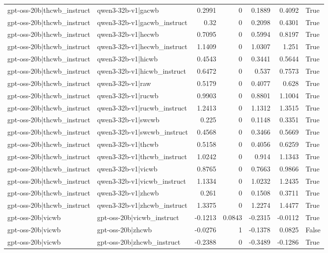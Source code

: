 \begin{table}
\begin{tabular}{l l r r r r l}
gpt-oss-20b|thcwb_instruct & qwen3-32b-v1|gacwb & 0.2991 & 0 & 0.1889 & 0.4092 & True \\
gpt-oss-20b|thcwb_instruct & qwen3-32b-v1|gacwb_instruct & 0.32 & 0 & 0.2098 & 0.4301 & True \\
gpt-oss-20b|thcwb_instruct & qwen3-32b-v1|hecwb & 0.7095 & 0 & 0.5994 & 0.8197 & True \\
gpt-oss-20b|thcwb_instruct & qwen3-32b-v1|hecwb_instruct & 1.1409 & 0 & 1.0307 & 1.251 & True \\
gpt-oss-20b|thcwb_instruct & qwen3-32b-v1|hicwb & 0.4543 & 0 & 0.3441 & 0.5644 & True \\
gpt-oss-20b|thcwb_instruct & qwen3-32b-v1|hicwb_instruct & 0.6472 & 0 & 0.537 & 0.7573 & True \\
gpt-oss-20b|thcwb_instruct & qwen3-32b-v1|raw & 0.5179 & 0 & 0.4077 & 0.628 & True \\
gpt-oss-20b|thcwb_instruct & qwen3-32b-v1|rucwb & 0.9903 & 0 & 0.8801 & 1.1004 & True \\
gpt-oss-20b|thcwb_instruct & qwen3-32b-v1|rucwb_instruct & 1.2413 & 0 & 1.1312 & 1.3515 & True \\
gpt-oss-20b|thcwb_instruct & qwen3-32b-v1|swcwb & 0.225 & 0 & 0.1148 & 0.3351 & True \\
gpt-oss-20b|thcwb_instruct & qwen3-32b-v1|swcwb_instruct & 0.4568 & 0 & 0.3466 & 0.5669 & True \\
gpt-oss-20b|thcwb_instruct & qwen3-32b-v1|thcwb & 0.5158 & 0 & 0.4056 & 0.6259 & True \\
gpt-oss-20b|thcwb_instruct & qwen3-32b-v1|thcwb_instruct & 1.0242 & 0 & 0.914 & 1.1343 & True \\
gpt-oss-20b|thcwb_instruct & qwen3-32b-v1|vicwb & 0.8765 & 0 & 0.7663 & 0.9866 & True \\
gpt-oss-20b|thcwb_instruct & qwen3-32b-v1|vicwb_instruct & 1.1334 & 0 & 1.0232 & 1.2435 & True \\
gpt-oss-20b|thcwb_instruct & qwen3-32b-v1|zhcwb & 0.261 & 0 & 0.1508 & 0.3711 & True \\
gpt-oss-20b|thcwb_instruct & qwen3-32b-v1|zhcwb_instruct & 1.3375 & 0 & 1.2274 & 1.4477 & True \\
gpt-oss-20b|vicwb & gpt-oss-20b|vicwb_instruct & -0.1213 & 0.0843 & -0.2315 & -0.0112 & True \\
gpt-oss-20b|vicwb & gpt-oss-20b|zhcwb & -0.0276 & 1 & -0.1378 & 0.0825 & False \\
gpt-oss-20b|vicwb & gpt-oss-20b|zhcwb_instruct & -0.2388 & 0 & -0.3489 & -0.1286 & True \\

\end{tabular}
\end{table}
